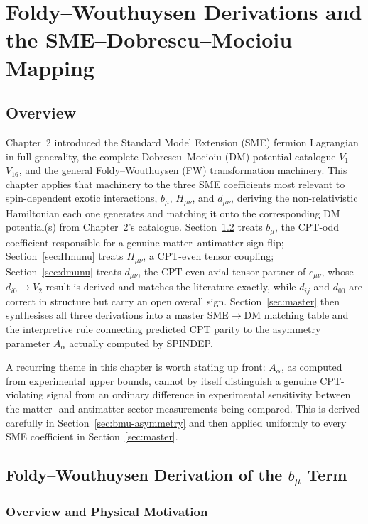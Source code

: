 \documentclass[main]{subfiles}
\begin{document}
\ifSubfilesClassLoaded{\setcounter{chapter}{2}}{}
\chapter{Foldy--Wouthuysen Derivations and the SME--Dobrescu--Mocioiu Mapping}

\section{Overview}

Chapter~2 introduced the Standard Model Extension (SME) fermion Lagrangian in
full generality, the complete Dobrescu--Mocioiu (DM) potential catalogue
$V_1$--$V_{16}$, and the general Foldy--Wouthuysen (FW) transformation
machinery. This chapter applies that machinery to the three SME coefficients
most relevant to spin-dependent exotic interactions, $b_\mu$, $H_{\mu\nu}$,
and $d_{\mu\nu}$, deriving the non-relativistic Hamiltonian each one
generates and matching it onto the corresponding DM potential(s) from
Chapter~2's catalogue. Section~\ref{sec:bmu} treats $b_\mu$, the CPT-odd
coefficient responsible for a genuine matter--antimatter sign flip;
Section~\ref{sec:Hmunu} treats $H_{\mu\nu}$, a CPT-even tensor coupling;
Section~\ref{sec:dmunu} treats $d_{\mu\nu}$, the CPT-even axial-tensor
partner of $c_{\mu\nu}$, whose $d_{i0}\to V_2$ result is derived and
matches the literature exactly, while $d_{ij}$ and $d_{00}$ are correct in
structure but carry an open overall sign. Section~\ref{sec:master} then
synthesises all three derivations into a master SME$\to$DM matching table
and the interpretive rule connecting predicted CPT parity to the asymmetry
parameter $A_\alpha$ actually computed by SPINDEP.

A recurring theme in this chapter is worth stating up front: $A_\alpha$, as
computed from experimental upper bounds, cannot by itself distinguish a
genuine CPT-violating signal from an ordinary difference in experimental
sensitivity between the matter- and antimatter-sector measurements being
compared. This is derived carefully in Section~\ref{sec:bmu-asymmetry} and
then applied uniformly to every SME coefficient in Section~\ref{sec:master}.

\section{Foldy--Wouthuysen Derivation of the \texorpdfstring{$b_\mu$}{b\_mu} Term}
\label{sec:bmu}

\subsection{Overview and Physical Motivation}
\end{document}

